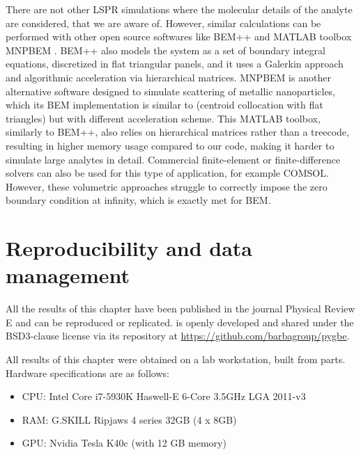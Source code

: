 There are not other LSPR simulations where the molecular details of the analyte 
are considered, that we are aware of. However, similar calculations can be 
performed with other open source softwares like BEM++ \cite{SmigajETal2015} and 
MATLAB toolbox MNPBEM \cite{HohenesterTrugler2012}. BEM++ also models the system
as a set of boundary integral equations, discretized in flat triangular panels, 
and it uses a Galerkin approach and algorithmic acceleration via hierarchical 
matrices. MNPBEM is another alternative software designed to simulate scattering
of metallic nanoparticles, which its BEM implementation is similar to \pygbe 
(centroid collocation with flat triangles) but with different acceleration scheme.
This MATLAB toolbox, similarly to BEM++, also relies on hierarchical matrices 
rather than a treecode, resulting in higher memory usage compared to our code, 
making it harder to simulate large analytes in detail. 
Commercial finite-element or finite-difference solvers can also be used for this
type of application, for example COMSOL. However, these volumetric approaches 
struggle to correctly impose the zero boundary condition at infinity, which is
exactly met for BEM.  

\section{Reproducibility and data management} \label{sec:repro_lspr}

All the results of this chapter have been published in the journal 
Physical Review E \cite{ClementiETal2019} and can be reproduced or replicated. \pygbe is openly developed and 
shared under the BSD3-clause license via its repository at \url{https://github.com/barbagroup/pygbe}.

All results of this chapter were obtained on a lab workstation, built from parts. Hardware specifications are as follows:

\begin{itemize}
  \item CPU: Intel Core i7-5930K Haswell-E 6-Core 3.5GHz LGA 2011-v3
  \item RAM: G.SKILL Ripjaws 4 series 32GB (4 x 8GB)
  \item GPU: Nvidia Tesla K40c (with 12 GB memory)
\end{itemize}

